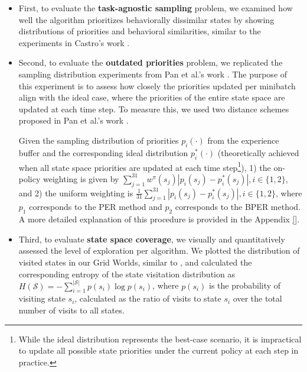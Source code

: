 \begin{itemize}
    \item First, to evaluate the \textbf{task-agnostic sampling} problem, we examined how well the algorithm prioritizes behaviorally dissimilar states by showing distributions of priorities and behavioral similarities, similar to the experiments in Castro's work \cite{castro2020scalable}.

    \item Second, to evaluate the \textbf{outdated priorities} problem, we replicated the sampling distribution experiments from Pan et al.'s work \cite{pan2022understanding}. The purpose of this experiment is to assess how closely the priorities updated per minibatch align with the ideal case, where the priorities of the entire state space are updated at each time step. To measure this, we used two distance schemes proposed in Pan et al.'s work \cite{pan2022understanding}.

    Given the sampling distribution of priorities \(p_i(\cdot)\) from the experience buffer and the corresponding ideal distribution \(p_i^*(\cdot)\) (theoretically achieved when all state space priorities are updated at each time step\footnote{While the ideal distribution represents the best-case scenario, it is impractical to update all possible state priorities under the current policy at each step in practice.}), 1) the on-policy weighting is given by \(\sum_{j=1}^{31} w^\pi(s_j) | p_i(s_j) -p_i^*(s_j)|, i \in \{1,2\}\), and 2) the uniform weighting is \(\frac{1}{31} \sum_{j=1}^{31} | p_i(s_j) -p_i^*(s_j) |, i \in \{1,2\}\), where \(p_1\) corresponds to the PER method and \(p_2\) corresponds to the BPER method. A more detailed explanation of this procedure is provided in the Appendix \ref{}.
    
    \item Third, to evaluate \textbf{state space coverage}, we visually and quantitatively assessed the level of exploration per algorithm. We plotted the distribution of visited states in our Grid Worlds, similar to \cite{pan2022understanding}, and calculated the corresponding entropy of the state visitation distribution as $H(\mathcal{S}) = - \sum_{i=1}^{|\mathcal{S}|} p(s_i) \log p(s_i)$, where \(p(s_i)\) is the probability of visiting state \(s_i\), calculated as the ratio of visits to state \(s_i\) over the total number of visits to all states.
\end{itemize}


